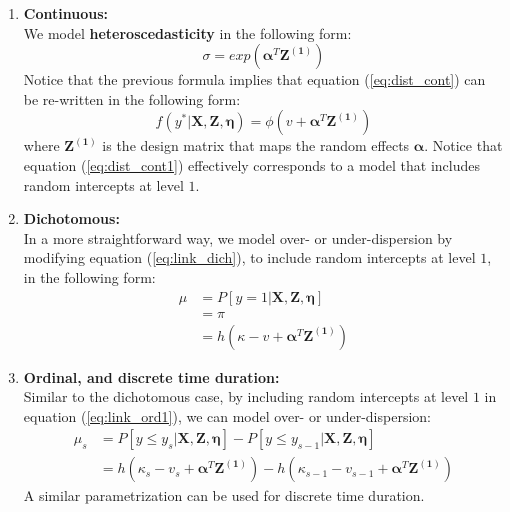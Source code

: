 \begin{enumerate}
	\item \textbf{Continuous:} \\
	We model \textbf{heteroscedasticity} in the following form:
	\begin{equation} \label{eq:het_cont}
		\sigma = exp(\pmb{\alpha}^{T}\mathbf{Z^{(1)}})
	\end{equation}
	Notice that the previous formula implies that equation (\ref{eq:dist_cont}) can be re-written in the following form:
	\begin{equation} \label{eq:dist_cont1}
			f(y^{*}| \mathbf{X}, \mathbf{Z}, \pmb{\eta}) = \phi(v + \pmb{\alpha}^{T}\mathbf{Z^{(1)}})
	\end{equation}
	where $\mathbf{Z^{(1)}}$ is the design matrix that maps the random effects $\pmb{\alpha}$. Notice that equation (\ref{eq:dist_cont1}) effectively corresponds to a model that includes random intercepts at level $1$. 
	
	
	
	\item \textbf{Dichotomous:} \\
	In a more straightforward way, we model over- or under-dispersion by modifying equation (\ref{eq:link_dich}), to include random intercepts at level $1$, in the following form:
	\begin{equation} \label{eq:link_dich1}
		\begin{split}
			\mu &= P[y=1 | \mathbf{X}, \mathbf{Z}, \pmb{\eta}] \\
			&= \pi \\
			&= h(\kappa - v + \pmb{\alpha}^{T}\mathbf{Z^{(1)}})
		\end{split}	
	\end{equation}
	
	
	
	\item \textbf{Ordinal, and discrete time duration:} \\
	Similar to the dichotomous case, by including random intercepts at level $1$ in equation (\ref{eq:link_ord1}), we can model over- or under-dispersion:
	\begin{equation} \label{eq:link_ord3}
		\begin{split}
			\mu_{s} &= P[y \leq y_{s} | \mathbf{X}, \mathbf{Z}, \pmb{\eta}] - P[y \leq y_{s-1} | \mathbf{X}, \mathbf{Z}, \pmb{\eta}] \\
			&= h(\kappa_{s} - v_{s} + \pmb{\alpha}^{T}\mathbf{Z^{(1)}}) - h(\kappa_{s-1} - v_{s-1} + \pmb{\alpha}^{T}\mathbf{Z^{(1)}})
		\end{split}
	\end{equation}
	A similar parametrization can be used for discrete time duration.



\end{enumerate}
